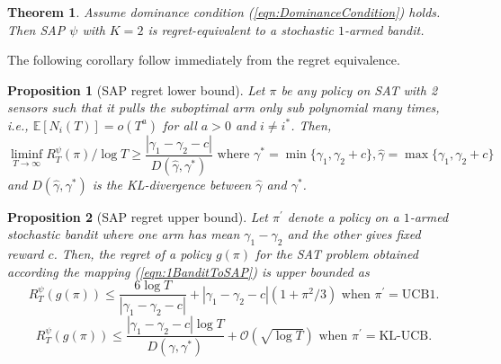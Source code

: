 \documentclass{article}
\newtheorem{thm}{Theorem}
\newtheorem{proposition}{Proposition}
\begin{document}
\begin{thm}
	\label{thm:2SAPRegret}
Assume dominance condition (\ref{eqn:DominanceCondition}) holds. Then SAP $\psi$ with $K=2$ is regret-equivalent to a stochastic $1$-armed bandit.
\end{thm}
The following corollary follow immediately from the regret equivalence. 
\begin{proposition}[SAP regret lower bound]
	Let $\pi$ be any policy on SAT with 2 sensors such that it pulls the suboptimal arm only sub polynomial many times, i.e., $\mathbb{E}[N_i(T)]=o(T^a)$ for all $a>0$ and $i\neq i^*$. Then,
	\begin{equation}
	\liminf_{T \rightarrow \infty} R^\psi_T(\pi)/\log T \geq \frac{|\gamma_1-\gamma_2-c|}{D(\hat{\gamma},\gamma^*)} \mbox{ where } \gamma^*=\min\{\gamma_1,\gamma_2+c\},  \hat{\gamma}=\max\{\gamma_1,\gamma_2+c\}
	\end{equation}
	and $D(\hat{\gamma},\gamma^*)$  is the KL-divergence between $\hat{\gamma}$ and $\gamma^*$.
\end{proposition}

\begin{proposition}[SAP regret upper bound]
	Let $\pi^\prime$ denote a policy on a $1$-armed stochastic bandit where one arm has mean $\gamma_1-\gamma_2$ and the other gives fixed reward $c$. Then, the regret of a policy $g(\pi)$ for the SAT problem obtained according the mapping (\ref{eqn:1BanditToSAP}) is upper bounded as
	\begin{equation}
	R^\psi_T(g(\pi))\leq \frac{6\log T}{|\gamma_1-\gamma_2-c|} + |\gamma_1-\gamma_2-c|(1+\pi^2/3) 	\mbox{ when } \pi^\prime=\mbox{UCB1}. 
	\end{equation}
		\begin{equation}
		R^\psi_T(g(\pi))\leq \frac{|\gamma_1-\gamma_2-c|\log T}{D(\hat{\gamma},\gamma^*)} + \mathcal{O}(\sqrt{\log T }) 	\mbox{ when } \pi^\prime=\mbox{KL-UCB}. 
		\end{equation}
\end{proposition}
\end{document}
